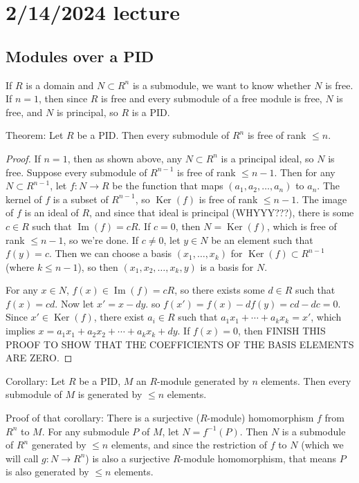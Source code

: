 \documentclass[12pt]{article}
\begin{document}
\section{2/14/2024 lecture}
\subsection{Modules over a PID}
If $R$ is a domain and $N \subset R^n$ is a submodule, we want to know whether $N$ is free. If $n=1$, then since $R$ is free and every submodule of a free module is free, $N$ is free, and $N$ is principal, so $R$ is a PID.
\par
Theorem: Let $R$ be a PID. Then every submodule of $R^n$ is free of rank $\leq n$.
\begin{proof}
    If $n=1$, then as shown above, any $N \subset R^n$ is a principal ideal, so $N$ is free. Suppose every submodule of $R^{n-1}$ is free of rank $\leq n-1$. Then for any $N \subset R^{n-1}$, let $f: N \rightarrow R$ be the function that maps $(a_1, a_2, \dots, a_n)$ to $a_n$. The kernel of $f$ is a subset of $R^{n-1}$, so $\operatorname{Ker}(f)$ is free of rank $\leq n-1$. The image of $f$ is an ideal of $R$, and since that ideal is principal (WHYYY???), there is some $c \in R$ such that $\operatorname{Im}(f)=cR$. If $c=0$, then $N=\operatorname{Ker}(f)$, which is free of rank $\leq n-1$, so we're done. If $c \neq 0$, let $y \in N$ be an element such that $f(y)=c$. Then we can choose a basis $(x_1, \dots, x_k)$ for $\operatorname{Ker}(f) \subset R^{n-1}$ (where $k \leq n-1$), so then $(x_1, x_2, \dots, x_k, y)$ is a basis for $N$.
    \par
    For any $x \in N$, $f(x) \in \operatorname{Im}(f) = cR$, so there exists some $d \in R$ such that $f(x)=cd$. Now let $x' = x-dy$. so $f(x')=f(x)-df(y)=cd-dc=0$. Since $x' \in \operatorname{Ker}(f)$, there exist $a_i \in R$ such that $a_1 x_1 + \cdots +a_kx_k = x'$, which implies $x=a_1x_1+a_2x_2+ \cdots + a_kx_k+dy$. If $f(x)=0$, then FINISH THIS PROOF TO SHOW THAT THE COEFFICIENTS OF THE BASIS ELEMENTS ARE ZERO.
\end{proof}
\par
Corollary: Let $R$ be a PID, $M$ an $R$-module generated by $n$ elements. Then every submodule of $M$ is generated by $\leq n$ elements.
\par
Proof of that corollary: There is a surjective ($R$-module) homomorphism $f$ from $R^n$ to $M$. For any submodule $P$ of $M$, let $N=f^{-1}(P)$. Then $N$ is a submodule of $R^n$ generated by $\leq n$ elements, and since the restriction of $f$ to $N$ (which we will call $g: N \rightarrow R^n$) is also a surjective $R$-module homomorphism, that means $P$ is also generated by $\leq n$ elements.
\end{document}

